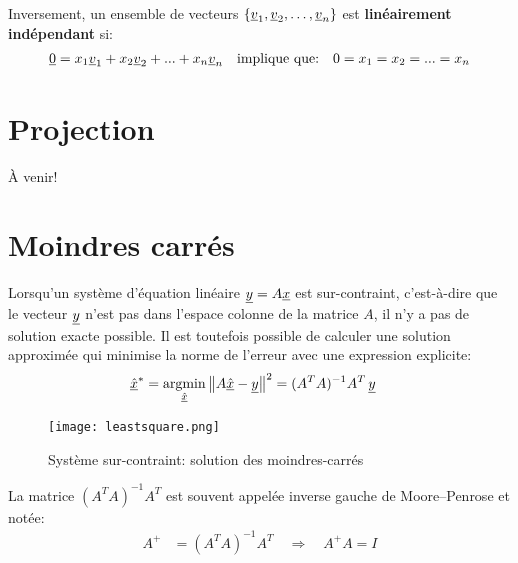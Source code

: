 Inversement, un ensemble de vecteurs $\left\{ \underline{v}_1, \underline{v}_2, \hdots, \underline{v}_n \right\}$ est \textbf{linéairement indépendant} si:
\begin{align}
\underline{0} = x_1 \underline{v}_1 + x_2 \underline{v}_2 + ... + x_n \underline{v}_n
\quad
\text{implique que:}
\quad
0 = x_1 = x_2 = ... = x_n 
\end{align}







\section{Projection}
\label{sec:projectionmatrix}

À venir!

\newpage
\section{Moindres carrés}
\label{sec:moindrecarre}

Lorsqu'un système d'équation linéaire $\underline{y} = A \underline{x}$ est sur-contraint, c'est-à-dire que le vecteur $\underline{y}$ n'est pas dans l'espace colonne de la matrice $A$, il n'y a pas de solution exacte possible. Il est toutefois possible de calculer une solution approximée qui minimise la norme de l'erreur avec une expression explicite:
\begin{align}
\col{\hat{x}}^* &= \operatornamewithlimits{argmin}\limits_{\col{\hat{x}}} \left\| A \col{\hat{x}} - \col{y} \right\|^2
= (A^T A)^{-1} A^T \, \col{y}
\end{align}
\begin{figure}[htbp]
	\centering
		\texttt{[image: leastsquare.png]}
	\caption{Système sur-contraint: solution des moindres-carrés}
	\label{fig:leastsquare}
\end{figure}

La matrice $(A^T A)^{-1} A^T$ est souvent appelée inverse gauche de Moore–Penrose et notée:
\begin{align}
A^{+} &= (A^T A)^{-1} A^T  \quad \Rightarrow \quad A^{+} A = I
\end{align}

